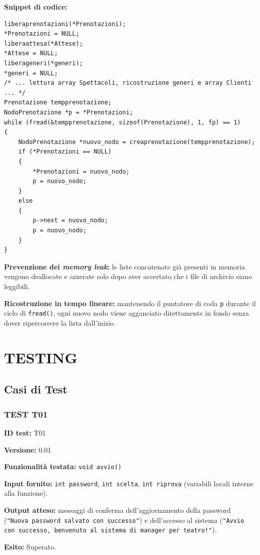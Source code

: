 \documentclass[11pt,a4paper,oneside,openany]{book}
\newenvironment{listacomp}{%
    \small
    \begin{list}{\textendash}{%
        \setlength{\topsep}{2pt}%
        \setlength{\partopsep}{0pt}%
        \setlength{\itemsep}{1pt}%
        \setlength{\parsep}{0pt}%
        \setlength{\leftmargin}{1.2em}%
    }%
}{%
    \end{list}%
}
\begin{document}
\begin{samepage}
\noindent\textbf{Snippet di codice:}
\begin{lstlisting}[caption={Pulizia sicura e ricostruzione della lista prenotazioni in caricadatabase()}]
liberaprenotazioni(*Prenotazioni);
*Prenotazioni = NULL;
liberaattesa(*Attese);
*Attese = NULL;
liberageneri(*generi);
*generi = NULL;
/* ... lettura array Spettacoli, ricostruzione generi e array Clienti ... */
Prenotazione tempprenotazione;
NodoPrenotazione *p = *Prenotazioni;
while (fread(&tempprenotazione, sizeof(Prenotazione), 1, fp) == 1)
{
    NodoPrenotazione *nuovo_nodo = creaprenotazione(tempprenotazione);
    if (*Prenotazioni == NULL)
    {
        *Prenotazioni = nuovo_nodo;
        p = nuovo_nodo;
    }
    else
    {
        p->next = nuovo_nodo;
        p = nuovo_nodo;
    }
}
\end{lstlisting}

\begin{listacomp}
    \item \textbf{Prevenzione dei \emph{memory leak}:} le liste concatenate già presenti in memoria vengono deallocate e azzerate solo dopo aver accertato che i file di archivio siano leggibili.
    \item \textbf{Ricostruzione in tempo lineare:} mantenendo il puntatore di coda \texttt{p} durante il ciclo di \texttt{fread()}, ogni nuovo nodo viene agganciato direttamente in fondo senza dover ripercorrere la lista dall'inizio.
\end{listacomp}
\end{samepage}

\chapter{TESTING}

\section{Casi di Test}

\subsection{TEST T01}
\begin{listacomp}
    \item \textbf{ID test:} T01
    \item \textbf{Versione:} 0.01
    \item \textbf{Funzionalità testata:} \texttt{void avvio()}
    \item \textbf{Input fornito:} \texttt{int password}, \texttt{int scelta}, \texttt{int riprova} (variabili locali interne alla funzione).
    \item \textbf{Output atteso:} messaggi di conferma dell'aggiornamento della password (\texttt{"Nuova password salvato con successo"}) e dell'accesso al sistema (\texttt{"Avvio con successo, benvenuto al sistema di manager per teatro!"}).
    \item \textbf{Esito:} Superato.
\end{listacomp}
\end{document}
